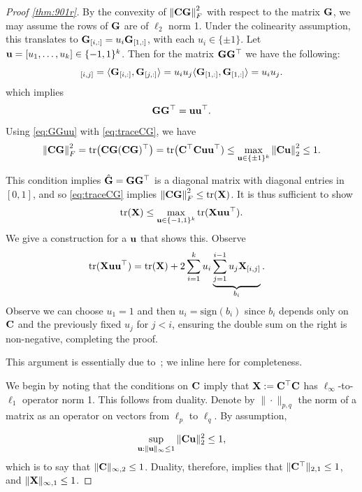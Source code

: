 \begin{proof}[Proof \cref{thm:901r}]
By the convexity of $\left\|\mathbf{C}\mathbf{G}\right\|_F^2$ with respect to the matrix $\mathbf{G}$, we  may assume the rows of $\mathbf{G}$ are of $\ell_2$ norm 1. Under the colinearity assumption, this translates to $\mathbf{G}_{[i,:]} = u_i \mathbf{G}_{[1,:]}$, with each $u_i\in\{\pm 1\}$. Let $\mathbf{u} = [u_1, \dots, u_k] \in \{-1, 1\}^k$. Then for the matrix $\mathbf{G}\mathbf{G}^\top$ we have the following:
\begin{equation*}    
  [\bfG \bfG\tp]\idx{i}{j} 
    = \ip{\bfG_{[i,:]}}{\bfG_{[j,:]}} 
    = u_i u_j \ip{\bfG_{[1,:]}}{\bfG_{[1,:]}} = u_i u_j.%
\end{equation*}
which implies
\begin{equation}\label{eq:GGuu}
    \mathbf{G} \mathbf{G}^\top = \mathbf{u} \mathbf{u}^\top.
\end{equation}
Using \cref{eq:GGuu} with \cref{eq:traceCG}, we have
\[
\left\|\mathbf{C}\mathbf{G}\right\|_F^2 
  = \mathrm{tr}\big(\mathbf{C} \mathbf{G} (\mathbf{C} \mathbf{G})^\top\big)
  = \mathrm{tr}\big(\mathbf{C}^\top \mathbf{C} \mathbf{u}\mathbf{u}^\top)\leq\max\limits_{\mathbf{u}\in\{\pm 1\}^k}\left\|\mathbf{C}\mathbf{u}\right\|_2^2 \le 1. 
\]

This condition implies $\hat{\mathbf{G}} = \mathbf{G} \mathbf{G}^\top$ is a diagonal matrix with diagonal entries in $[0, 1]$, and so \cref{eq:traceCG} implies $\left\|\mathbf{C} \mathbf{G}\right\|_F^2 \le \mathrm{tr}(\mathbf{X})$. It is thus sufficient to show
\[ \mathrm{tr}(\mathbf{X}) \le \max_{\mathbf{u} \in \{-1, 1\}^k} \mathrm{tr}(\mathbf{X} \mathbf{u} \mathbf{u}^\top).
\]
We give a construction for a $\mathbf{u}$ that shows this. Observe
\begin{align*}
\mathrm{tr}(\mathbf{X} \mathbf{u} \mathbf{u}^\top) 
  &= \mathrm{tr}(\mathbf{X}) + 2\sum_{i=1}^k u_i 
     \underbrace{\sum_{j=1}^{i-1} u_j \mathbf{X}_{[i, j]}}_{b_i}. 
\end{align*}
Observe we can choose $u_1 = 1$ and then $u_i = \text{sign}(b_i)$ since $b_i$ depends only on $\mathbf{C}$ and the previously fixed $u_j$ for $j < i$, ensuring the double sum on the right is non-negative, completing the proof.




This argument is essentially due to~\citep{denisov_grothendieck}; we inline here for completeness.

We begin by noting that the conditions on $\mathbf{C}$ imply that $\mathbf{X} := \mathbf{C}^\top \mathbf{C}$ has $\ell_\infty$-to-$\ell_1$ operator norm 1. This follows from duality. Denote by $\| \cdot \|_{p, q}$ the norm of a matrix as an operator on vectors from $\ell_p$ to $\ell_q$. By assumption,

$$\sup_{\mathbf{u}: \|\mathbf{u}\|_\infty \leq 1} \|\mathbf{C}\mathbf{u}\|_2^2 \leq 1,$$
which is to say that $\|\mathbf{C}\|_{\infty, 2}  \leq 1$. Duality, therefore, implies that $\|\mathbf{C}^\top\|_{2, 1} \leq 1$, and $\|\mathbf{X}\|_{\infty, 1} \leq 1$.


\end{proof}
